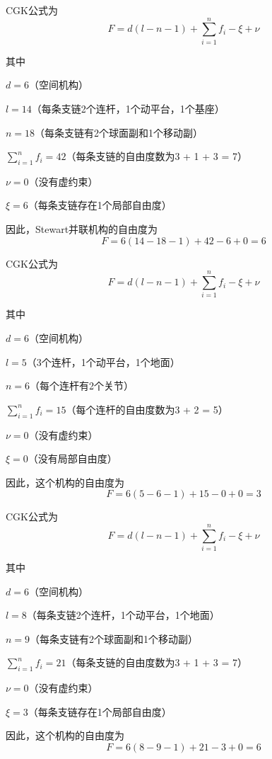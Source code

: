 \documentclass{homework}
\begin{document}
\begin{sol}

CGK公式为
\[
  F = d(l - n - 1) + \sum_{i=1}^{n} f_i - \xi + \nu
\]

其中

$ d = 6 $（空间机构）

$ l = 14 $（每条支链2个连杆，1个动平台，1个基座）

$ n = 18 $（每条支链有2个球面副和1个移动副）

$ \sum_{i=1}^{n} f_i = 42 $（每条支链的自由度数为3 + 1 + 3 = 7）

$ \nu = 0 $（没有虚约束）

$ \xi = 6 $（每条支链存在1个局部自由度）

因此，Stewart并联机构的自由度为
\[
  F = 6(14 - 18 - 1) + 42 - 6 + 0 = 6
\]

\end{sol}

\question

\begin{sol}

CGK公式为
\[
  F = d(l - n - 1) + \sum_{i=1}^{n} f_i - \xi + \nu
\]

其中

$ d = 6 $（空间机构）

$ l = 5 $（3个连杆，1个动平台，1个地面）

$ n = 6 $（每个连杆有2个关节）

$ \sum_{i=1}^{n} f_i = 15 $（每个连杆的自由度数为3 + 2 = 5）

$ \nu = 0 $（没有虚约束）

$ \xi = 0 $（没有局部自由度）

因此，这个机构的自由度为
\[
  F = 6(5 - 6 - 1) + 15 - 0 + 0 = 3
\]

\end{sol}

\question

\begin{sol}

CGK公式为
\[
  F = d(l - n - 1) + \sum_{i=1}^{n} f_i - \xi + \nu
\]

其中

$ d = 6 $（空间机构）

$ l = 8 $（每条支链2个连杆，1个动平台，1个地面）

$ n = 9 $（每条支链有2个球面副和1个移动副）

$ \sum_{i=1}^{n} f_i = 21 $（每条支链的自由度数为3 + 1 + 3 = 7）

$ \nu = 0 $（没有虚约束）

$ \xi = 3 $（每条支链存在1个局部自由度）

因此，这个机构的自由度为
\[
  F = 6(8 - 9 - 1) + 21 - 3 + 0 = 6
\]

\end{sol}
\end{document}
